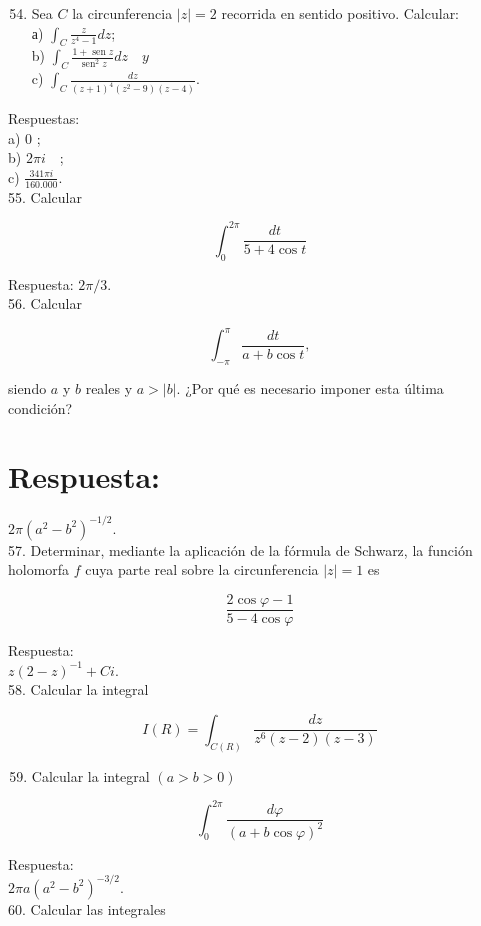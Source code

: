 \documentclass[10pt]{article}
\theoremstyle{plain}
\theoremstyle{definition}
\theoremstyle{remark}
\begin{document}
\begin{enumerate}
  \setcounter{enumi}{53}
  \item Sea $C$ la circunferencia $|z|=2$ recorrida en sentido positivo. Calcular:\\
а) $\int_{C} \frac{z}{z^{4}-1} d z$;\\
b) $\int_{C} \frac{1+\operatorname{sen} z}{\operatorname{sen}^{2} z} d z \quad y$\\
c) $\int_{C} \frac{d z}{(z+1)^{4}\left(z^{2}-9\right)(z-4)}$.
\end{enumerate}

Respuestas:\\
a) 0 ;\\
b) $2 \pi i \quad$;\\
c) $\frac{341 \pi i}{160.000}$.\\
55. Calcular

$$
\int_{0}^{2 \pi} \frac{d t}{5+4 \cos t}
$$

Respuesta: $2 \pi / 3$.\\
56. Calcular

$$
\int_{-\pi}^{\pi} \frac{d t}{a+b \cos t},
$$

siendo $a$ y $b$ reales y $a>|b|$. ¿Por qué es necesario imponer esta última condición?

\section*{Respuesta:}
$2 \pi\left(a^{2}-b^{2}\right)^{-1 / 2}$.\\
57. Determinar, mediante la aplicación de la fórmula de Schwarz, la función holomorfa $f$ cuya parte real sobre la circunferencia $|z|=1$ es

$$
\frac{2 \cos \varphi-1}{5-4 \cos \varphi}
$$

Respuesta:\\
$z(2-z)^{-1}+C i$.\\
58. Calcular la integral

$$
I(R)=\int_{C(R)} \frac{d z}{z^{6}(z-2)(z-3)}
$$

\begin{enumerate}
  \setcounter{enumi}{58}
  \item Calcular la integral $(a>b>0)$
\end{enumerate}

$$
\int_{0}^{2 \pi} \frac{d \varphi}{(a+b \cos \varphi)^{2}}
$$

Respuesta:\\
$2 \pi a\left(a^{2}-b^{2}\right)^{-3 / 2}$.\\
60. Calcular las integrales
\end{document}

